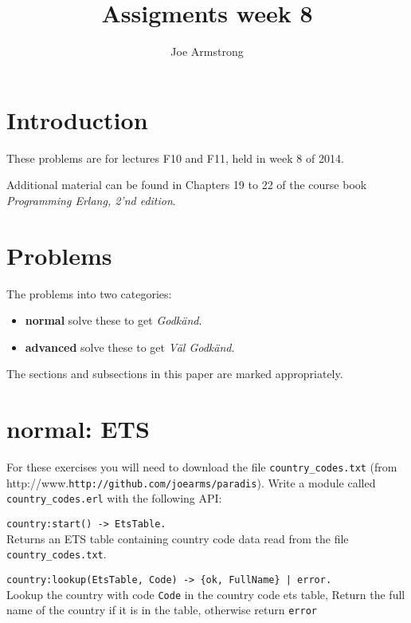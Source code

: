 \documentclass[12pt]{hitec}
\title{Assigments week 8}
\author{Joe Armstrong}
\begin{document}
\maketitle

\tableofcontents

\section{Introduction}
These problems are for lectures F10 and F11, held in week 8 of 2014.

Additional material can be found in Chapters 19 to 22 of the course book
{\sl Programming Erlang, 2'nd edition}.

\section{Problems}

The problems into two categories:

\begin{itemize}
\item {\bf normal} solve these to get {\sl Godk\"{a}nd}.
\item {\bf advanced} solve these to get {\sl V\"{a}l Godk\"{a}nd}.
\end{itemize}

The sections and subsections in this paper are marked appropriately.

\section{normal: ETS}

For these exercises you will need to download the file \verb+country_codes.txt+ (from
http://www.\verb+http://github.com/joearms/paradis+). Write a module called
\verb+country_codes.erl+ with the following API:

\begin{description}
\item \verb+country:start() -> EtsTable.+\\
Returns an ETS table containing country code data read from the file
\verb+country_codes.txt+.
\item \verb+country:lookup(EtsTable, Code) -> {ok, FullName} | error.+\\
Lookup the country with code \verb+Code+ in the country code ets table,
Return the full name of the country if it is in the table, otherwise return
\verb+error+
\end{description}
\end{document}
